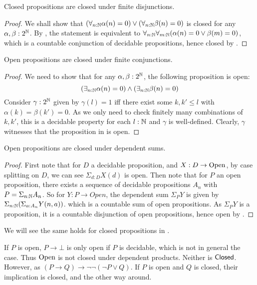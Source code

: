 \begin{lemma}\label{ClosedFiniteDisjunction} 
  Closed propositions are closed under finite disjunctions. 
\end{lemma}
\begin{proof}
  We shall show that 
  $(\forall_{n:\mathbb{N}} \alpha(n) = 0 )\vee (\forall_{n:\mathbb{N}} \beta(n) = 0 )$ is closed for any $\alpha,\beta:2^{\mathbb{N}}$.
  By , the statement is equivalent to 
  $ \forall_{n:\mathbb{N}}  \forall_{m:\mathbb{N}}  (\alpha(n) = 0 \vee \beta(m) = 0)$, 
  which is a countable conjunction of decidable propositions, 
  hence closed by .
\end{proof}
\begin{lemma}\label{OpenFiniteConjunction}
  Open propositions are closed under finite conjunctions. 
\end{lemma}
\begin{proof}
  We need to show that for any $\alpha,\beta:2^{\mathbb{N}}$, the following proposition is open:
  \begin{equation}\label{eqnConjunctionOpen}
    (\exists_{n:\mathbb{N}} \alpha(n) = 0 )\wedge(\exists_{n:\mathbb{N}} \beta(n) = 0 )
  \end{equation}
  Consider $\gamma:2^{\mathbb{N}}$ given by 
  $\gamma(l) = 1$ iff there exist some $k,k'\leq l$ with 
  $\alpha(k) = \beta(k') = 0$. 
  As we only need to check finitely many combinations 
  of $k,k'$, this is a decidable property for each $l:\mathbb{N}$ and $\gamma$ is well-defined. 
  Clearly, $\gamma$ witnesses that the proposition in  is open.
\end{proof}

\begin{lemma}\label{OpenDependentSums}
  Open propositions are closed under dependent sums.
\end{lemma}
\begin{proof}
  First note that for $D$ a decidable proposition, and $X:D \to \mathrm{Open}$,
  by case splitting on $D$, we can see 
  $\Sigma_{d:D} X(d)$ is open.
%
  Then note that for $P$ an open proposition, 
  there exists a sequence of decidable propositions $A_n$ with 
  $P = \Sigma_{n:\mathbb{N}} A_n $.
%
  So for $Y : P \to Open $, the dependent sum $\Sigma_P Y$ is given by 
  $\Sigma_{n:\mathbb{N}} (\Sigma_{a:A_n} Y(n,a))$. 
  which is a countable sum of open propositions. 
  As $\Sigma_P Y$ is a proposition, it is 
  a countable disjunction of open propositions, 
  hence open by .
\end{proof}
We will see the same holds for closed propositions in .

\begin{remark}
  If $P$ is open, $P \to \bot$ is only open if $P$ is decidable, which is not in general the case. 
  Thus $\mathrm{Open}$ is not closed under dependent products. Neither is $\mathsf{Closed}$. 
  However, as $(P\to Q)  \to \neg \neg (\neg P \vee Q)$. 
  If $P$ is open and $Q$ is closed, their implication is closed, and the other way around. 
\end{remark}
